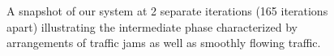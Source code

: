 \begin{figure}[H]
        \myfloatalign
         \quad
         \quad
        \caption{A snapshot of our system at 2 separate iterations (165 iterations apart) illustrating the intermediate phase characterized by arrangements of traffic jams as well as smoothly flowing traffic.}
\end{figure}